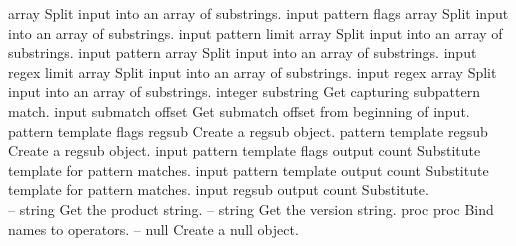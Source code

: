 \begin{longtable}{}
	{array}
	{Split input into an array of substrings.}
\optableent
	{input pattern flags}
	{{\bf {}}}
	{array}
	{Split input into an array of substrings.}
\optableent
	{input pattern limit}
	{{\bf {}}}
	{array}
	{Split input into an array of substrings.}
\optableent
	{input pattern}
	{{\bf {}}}
	{array}
	{Split input into an array of substrings.}
\optableent
	{input regex limit}
	{{\bf {}}}
	{array}
	{Split input into an array of substrings.}
\optableent
	{input regex}
	{{\bf {}}}
	{array}
	{Split input into an array of substrings.}
\hline
\optableent
	{integer}
	{{\bf {}}}
	{substring}
	{Get capturing subpattern match.}
\hline
\optableent
	{input submatch}
	{{\bf {}}}
	{offset}
	{Get submatch offset from beginning of input.}
\hline
\optableent
	{pattern template flags}
	{{\bf {}}}
	{regsub}
	{Create a regsub object.}
\optableent
	{pattern template}
	{{\bf {}}}
	{regsub}
	{Create a regsub object.}
\hline
\optableent
	{input pattern template flags}
	{{\bf {}}}
	{output count}
	{Substitute template for pattern matches.}
\optableent
	{input pattern template}
	{{\bf {}}}
	{output count}
	{Substitute template for pattern matches.}
\optableent
	{input regsub}
	{{\bf {}}}
	{output count}
	{Substitute.}
\hline \hline
{} \\
\hline \hline
\optableent
	{--}
	{{\bf {}}}
	{string}
	{Get the product string.}
\hline
\optableent
	{--}
	{{\bf {}}}
	{string}
	{Get the version string.}
\hline
\optableent
	{proc}
	{{\bf {}}}
	{proc}
	{Bind names to operators.}
\hline
\optableent
	{--}
	{{\bf {}}}
	{null}
	{Create a null object.}
\end{longtable}

